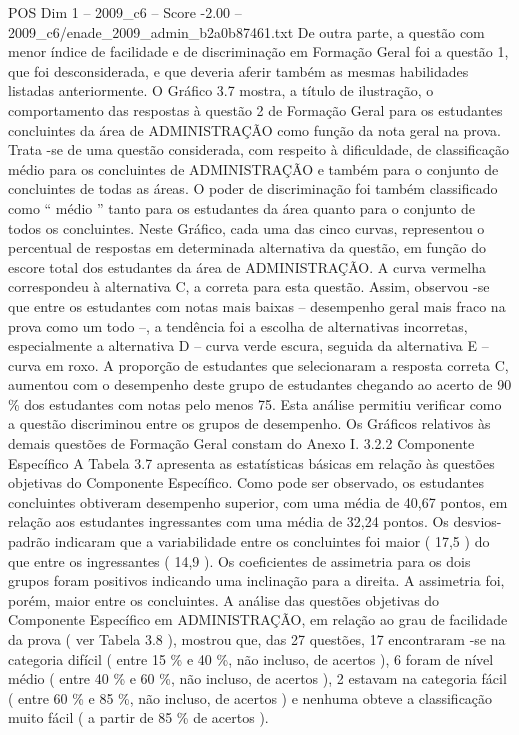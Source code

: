 \begin{textsample}{POS Dim 1 – 2009\_c6 – Score -2.00 – 2009\_c6/enade\_2009\_admin\_b2a0b87461.txt}
De outra parte, a questão com menor índice de facilidade e de discriminação em Formação Geral foi a questão 1, que foi desconsiderada, e que deveria aferir também as mesmas habilidades listadas anteriormente.
O Gráfico 3.7 mostra, a título de ilustração, o comportamento das respostas à questão 2 de Formação Geral para os estudantes concluintes da área de ADMINISTRAÇÃO como função da nota geral na prova.
Trata -se de uma questão considerada, com respeito à dificuldade, de classificação médio para os concluintes de ADMINISTRAÇÃO e também para o conjunto de concluintes de todas as áreas.
O poder de discriminação foi também classificado como “ médio ” tanto para os estudantes da área quanto para o conjunto de todos os concluintes.
Neste Gráfico, cada uma das cinco curvas, representou o percentual de respostas em determinada alternativa da questão, em função do escore total dos estudantes da área de ADMINISTRAÇÃO.
A curva vermelha correspondeu à alternativa C, a correta para esta questão.
Assim, observou -se que entre os estudantes com notas mais baixas – desempenho geral mais fraco na prova como um todo –, a tendência foi a escolha de alternativas incorretas, especialmente a alternativa D – curva verde escura, seguida da alternativa E – curva em roxo.
A proporção de estudantes que selecionaram a resposta correta C, aumentou com o desempenho deste grupo de estudantes chegando ao acerto de 90 \% dos estudantes com notas pelo menos 75.
Esta análise permitiu verificar como a questão discriminou entre os grupos de desempenho.
Os Gráficos relativos às demais questões de Formação Geral constam do Anexo I. 3.2.2 Componente Específico A Tabela 3.7 apresenta as estatísticas básicas em relação às questões objetivas do Componente Específico.
Como pode ser observado, os estudantes concluintes obtiveram desempenho superior, com uma média de 40,67 pontos, em relação aos estudantes ingressantes com uma média de 32,24 pontos.
Os desvios-padrão indicaram que a variabilidade entre os concluintes foi maior ( 17,5 ) do que entre os ingressantes ( 14,9 ).
Os coeficientes de assimetria para os dois grupos foram positivos indicando uma inclinação para a direita.
A assimetria foi, porém, maior entre os concluintes.
A análise das questões objetivas do Componente Específico em ADMINISTRAÇÃO, em relação ao grau de facilidade da prova ( ver Tabela 3.8 ), mostrou que, das 27 questões, 17 encontraram -se na categoria difícil ( entre 15 \% e 40 \%, não incluso, de acertos ), 6 foram de nível médio ( entre 40 \% e 60 \%, não incluso, de acertos ), 2 estavam na categoria fácil ( entre 60 \% e 85 \%, não incluso, de acertos ) e nenhuma obteve a classificação muito fácil ( a partir de 85 \% de acertos ).

\end{textsample}
